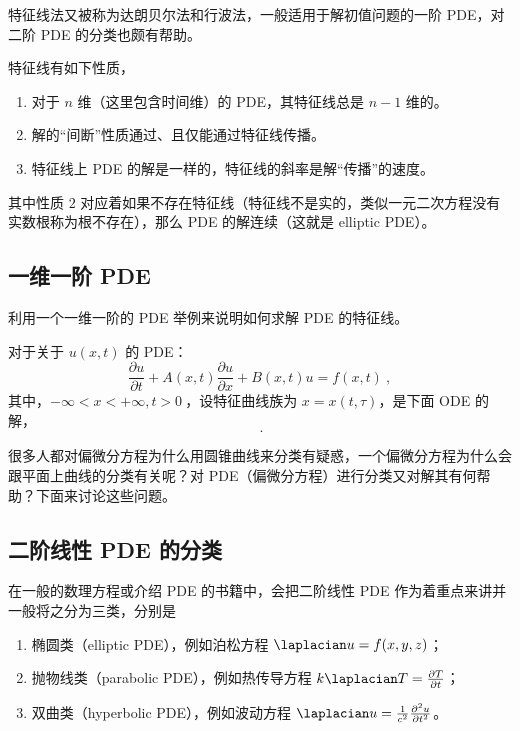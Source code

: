 
\begin{issues}
\issueMissDepend
\issueTODO
\issueDraft
\end{issues}

特征线法又被称为达朗贝尔法和行波法，一般适用于解初值问题的一阶 PDE，对二阶 PDE 的分类也颇有帮助。

特征线有如下性质，
\begin{enumerate}
\item 对于 $n$ 维（这里包含时间维）的 PDE，其特征线总是 $n-1$ 维的。
\item 解的“间断”性质通过、且仅能通过特征线传播。
\item 特征线上 PDE 的解是一样的，特征线的斜率是解“传播”的速度。
\end{enumerate}
其中性质 $2$ 对应着如果不存在特征线（特征线不是实的，类似一元二次方程没有实数根称为根不存在），那么 PDE 的解连续（这就是 elliptic PDE）。

\subsection{一维一阶 PDE}
利用一个一维一阶的 PDE 举例来说明如何求解 PDE 的特征线。

\begin{theorem}{}
对于关于 $u(x, t)$ 的 PDE：
\begin{equation}
\frac{\partial u}{\partial t} + A(x, t) \frac{\partial u}{\partial x} + B(x, t) u = f(x, t) ~,
\end{equation}
其中，$-\infty < x < +\infty, t > 0 ~$，设特征曲线族为 $x = x(t, \tau)$，是下面 ODE 的解，
\begin{equation}
~.
\end{equation}

\end{theorem}

很多人都对偏微分方程为什么用圆锥曲线来分类有疑惑，一个偏微分方程为什么会跟平面上曲线的分类有关呢？对 PDE（偏微分方程）进行分类又对解其有何帮助？下面来讨论这些问题。

\subsection{二阶线性 PDE 的分类}
在一般的数理方程或介绍 PDE 的书籍中，会把二阶线性 PDE 作为着重点来讲并一般将之分为三类，分别是
\begin{enumerate}
\item 椭圆类（elliptic PDE），例如泊松方程 $\laplacian u = f(x,y,z)$；
\item 抛物线类（parabolic PDE），例如热传导方程 $k \laplacian T = \frac{\partial T}{\partial t}$；
\item 双曲类（hyperbolic PDE），例如波动方程 $\laplacian u = \frac{1}{c^2} \frac{\partial^2 u}{\partial t^2}$。
\end{enumerate}

